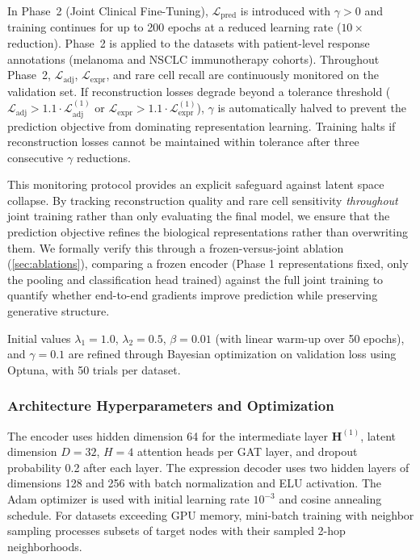 \documentclass{article}
\begin{document}
In Phase~2 (Joint Clinical Fine-Tuning), $\mathcal{L}_{\text{pred}}$ is introduced with $\gamma > 0$ and training continues for up to 200 epochs at a reduced learning rate ($10\times$ reduction). Phase~2 is applied to the datasets with patient-level response annotations (melanoma and NSCLC immunotherapy cohorts). Throughout Phase~2, $\mathcal{L}_{\text{adj}}$, $\mathcal{L}_{\text{expr}}$, and rare cell recall are continuously monitored on the validation set. If reconstruction losses degrade beyond a tolerance threshold ($\mathcal{L}_{\text{adj}} > 1.1 \cdot \mathcal{L}_{\text{adj}}^{(1)}$ or $\mathcal{L}_{\text{expr}} > 1.1 \cdot \mathcal{L}_{\text{expr}}^{(1)}$), $\gamma$ is automatically halved to prevent the prediction objective from dominating representation learning. Training halts if reconstruction losses cannot be maintained within tolerance after three consecutive $\gamma$ reductions.

This monitoring protocol provides an explicit safeguard against latent space collapse. By tracking reconstruction quality and rare cell sensitivity \textit{throughout} joint training rather than only evaluating the final model, we ensure that the prediction objective refines the biological representations rather than overwriting them. We formally verify this through a frozen-versus-joint ablation (\cref{sec:ablations}), comparing a frozen encoder (Phase 1 representations fixed, only the pooling and classification head trained) against the full joint training to quantify whether end-to-end gradients improve prediction while preserving generative structure.

Initial values $\lambda_1 = 1.0$, $\lambda_2 = 0.5$, $\beta = 0.01$ (with linear warm-up over 50 epochs), and $\gamma = 0.1$ are refined through Bayesian optimization on validation loss using Optuna, with 50 trials per dataset.


\subsubsection{Architecture Hyperparameters and Optimization}

The encoder uses hidden dimension 64 for the intermediate layer $\mathbf{H}^{(1)}$, latent dimension $D = 32$, $H = 4$ attention heads per GAT layer, and dropout probability 0.2 after each layer. The expression decoder uses two hidden layers of dimensions 128 and 256 with batch normalization and ELU activation. The Adam optimizer \cite{kingma2014adam} is used with initial learning rate $10^{-3}$ and cosine annealing schedule. For datasets exceeding GPU memory, mini-batch training with neighbor sampling \cite{hamilton2017inductive} processes subsets of target nodes with their sampled 2-hop neighborhoods.
\end{document}
